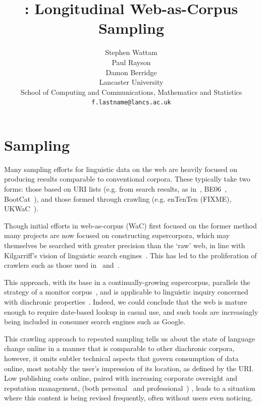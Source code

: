 \documentclass[11pt]{article}
\title{\toolname: Longitudinal Web-as-Corpus Sampling}
\author{Stephen Wattam\superscript{1}\\\And
  Paul Rayson\superscript{1}\\\And
  Damon Berridge\superscript{2}\\\AND
  Lancaster University\\
  School of Computing and Communications\superscript{1}, Mathematics and Statistics\superscript{2}\\
  {\tt f.lastname@lancs.ac.uk}\\
}
\date{}
\begin{document}
\maketitle

\section{Sampling}

Many sampling efforts for linguistic data on the web are heavily focused on producing results comparable to conventional corpora.  These typically take two forms: those based on URI lists (e.g. from search results, as in~\cite{sharoff2006creating}, BE06~\cite{baker2009be06}, BootCat~\cite{baroni2004bootcat}), and those formed through crawling (e.g. enTenTen (FIXME), %
UKWaC~\cite{ferraresi2008introducing}).

Though initial efforts in web-as-corpus (WaC) first focused on the former method %
many projects are now focused on constructing supercorpora, which may themselves be searched with greater precision than the `raw' web, in line with Kilgarriff's vision of linguistic search engines~\cite{kilgarriff2003linguistic}.  This has led to the proliferation of crawlers such as those used in~\cite{schafer8building} and~\cite{renouf2003webcorp}.


This approach, with its base in a continually-growing supercorpus, parallels the strategy of a monitor corpus~\cite{sinclair1982monitor}, and is applicable to linguistic inquiry concerned with diachronic properties~\cite{kehoe2006diachronic}.  Indeed, we could conclude that the web is mature enough to require date-based lookup in casual use, and such tools are increasingly being included in consumer search engines such as Google.

This crawling approach to repeated sampling tells us about the state of language change online in a manner that is comparable to other diachronic corpora, however, it omits subtler technical aspects that govern consumption of data online, most notably the user's impression of its location, as defined by the URI.  Low publishing costs online, paired with increasing corporate oversight and reputation management, (both personal~\cite{ICT4DBibliography1650} and professional~\cite{Malaga2000repman})
, leads to a situation where this content is being revised frequently, often without users even noticing.
\end{document}
